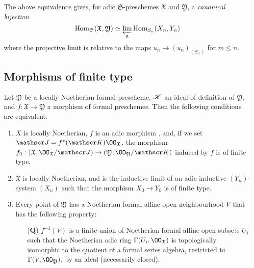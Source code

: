 \begin{env}[10.12.3.2]
\label{1.10.12.3.2}
The above equivalence gives, for adic $\mathfrak{S}$-preschemes $\mathfrak{X}$ and $\mathfrak{Y}$, a \emph{canonical bijection}
\[
  \operatorname{Hom}_\mathfrak{S}(\mathfrak{X},\mathfrak{Y})\simeq\varprojlim_n\operatorname{Hom}_{S_n}(X_n,Y_n)
\]
where the projective limit is relative to the maps $u_n\to(u_n)_{(S_m)}$ for $m\leq n$.
\end{env}

\subsection{Morphisms of finite type}
\label{subsection:1.10.13}

\begin{prop}[10.13.1]
\label{1.10.13.1}
Let $\mathfrak{Y}$ be a locally Noetherian formal prescheme, $\mathscr{K}$ an ideal of definition of $\mathfrak{Y}$, and $f:\mathfrak{X}\to\mathfrak{Y}$ a morphism of formal preschemes.
Then the following conditions are equivalent.
\begin{enumerate}[label=\emph{(\alph*)}]
  \item $X$ is locally Noetherian, $f$ is an adic morphism , and, if we set $\sh{J}=f^*(\sh{K})\OO_\mathfrak{X}$, the morphism $f_0:(\mathfrak{X},\OO_\mathfrak{X}/\sh{J})\to(\mathfrak{Y},\OO_\mathfrak{Y}/\sh{K})$ induced by $f$ is of finite type.
  \item $\mathfrak{X}$ is locally Noetherian, and is the inductive limit of an adic inductive $(Y_n)$-system $(X_n)$ such that the morphism $X_0\to Y_0$ is of finite type.
  \item Every point of $\mathfrak{Y}$ has a Noetherian formal affine open neighbourhood $V$ that has the following property:
\begin{enumerate}
  \item[(\textbf{Q})] $f^{-1}(V)$ is a finite union of Noetherian formal affine open subsets $U_i$ such that the Noetherian adic ring $\Gamma(U_i,\OO_\mathfrak{X})$ is topologically isomorphic to the quotient of a formal series algebra, restricted  to $\Gamma(V,\OO_\mathfrak{Y})$, by an ideal (necessarily closed).
\end{enumerate}
\end{enumerate}
\end{prop}

